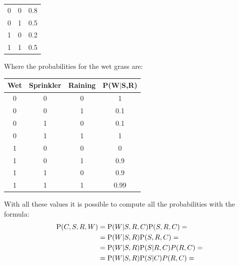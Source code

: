 \documentclass[12pt, a4paper]{report}
\begin{document}
\begin{example}
\begin{table}[H]
\begin{tabular}{ccc}
            0       & 0      & 0.8    \\
            0       & 1      & 0.5    \\
            1       & 0      & 0.2    \\
            1       & 1      & 0.5    \\ \hline
            \end{tabular}
        \end{table}
        Where the probabilities for the wet grass are: 
        \begin{table}[H]
            \centering
            \begin{tabular}{cccc}
            \hline
            \textbf{Wet} & \textbf{Sprinkler} & \textbf{Raining} & \textbf{P(W$|$S,R)} \\ \hline
            0            & 0                  & 0                & 1                   \\
            0            & 0                  & 1                & 0.1                 \\
            0            & 1                  & 0                & 0.1                 \\
            0            & 1                  & 1                & 1                   \\
            1            & 0                  & 0                & 0                   \\
            1            & 0                  & 1                & 0.9                 \\
            1            & 1                  & 0                & 0.9                 \\
            1            & 1                  & 1                & 0.99                \\ \hline
            \end{tabular}
        \end{table}
        With all these values it is possible to compute all the probabilities with the formula: 
        \[
        \begin{aligned}
            \textnormal{P}(C,S,R,W)     &= \textnormal{P}(W|S,R,C)\textnormal{P}(S,R,C)=      \\
                                        &= \textnormal{P}(W|S,R)\textnormal{P}(S,R,C)=        \\
                                        &= \textnormal{P}(W|S,R)\textnormal{P}(S|R,C)P(R,C)=  \\
                                        &= \textnormal{P}(W|S,R)\textnormal{P}(S|C)P(R,C)=    \\

\end{aligned}\]
\end{example}
\end{document}
